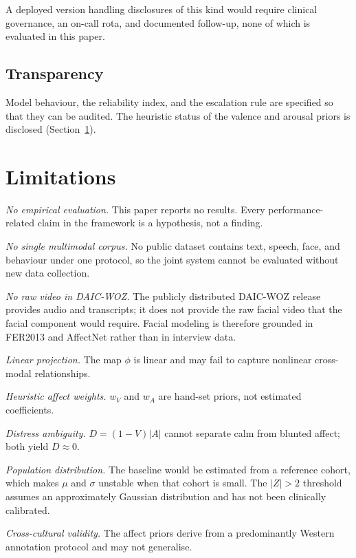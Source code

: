 \documentclass[12pt]{article}
\begin{document}
A deployed version handling disclosures of this kind would require
clinical governance, an on-call rota, and documented follow-up, none of
which is evaluated in this paper.

\subsection{Transparency}

Model behaviour, the reliability index, and the escalation rule are
specified so that they can be audited. The heuristic status of the
valence and arousal priors is disclosed (Section~\ref{sec:limitations}).

\section{Limitations}
\label{sec:limitations}

\emph{No empirical evaluation.} This paper reports no results. Every
performance-related claim in the framework is a hypothesis, not a
finding.

\emph{No single multimodal corpus.} No public dataset contains text,
speech, face, and behaviour under one protocol, so the joint system
cannot be evaluated without new data collection.

\emph{No raw video in DAIC-WOZ.} The publicly distributed DAIC-WOZ
release provides audio and transcripts; it does not provide the raw
facial video that the facial component would require. Facial modeling is
therefore grounded in FER2013 and AffectNet rather than in interview
data.

\emph{Linear projection.} The map $\phi$ is linear and may fail to
capture nonlinear cross-modal relationships.

\emph{Heuristic affect weights.} $w_V$ and $w_A$ are hand-set priors,
not estimated coefficients.

\emph{Distress ambiguity.} $D = (1-V)|A|$ cannot separate calm from
blunted affect; both yield $D \approx 0$.

\emph{Population distribution.} The baseline would be estimated from a
reference cohort, which makes $\mu$ and $\sigma$ unstable when that
cohort is small. The $|Z| > 2$ threshold assumes an approximately
Gaussian distribution and has not been clinically calibrated.

\emph{Cross-cultural validity.} The affect priors derive from a
predominantly Western annotation protocol and may not generalise.
\end{document}
